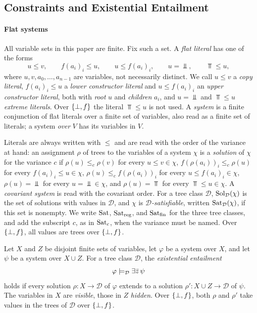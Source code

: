 \subsection{Constraints and Existential Entailment}\label{sec:bg-constraints}

\paragraph{Flat systems}
All variable sets in this paper are finite. Fix such a set. A \emph{flat literal} has one of the forms
\[
 u\le v,\qquad f(a_i)_i\le u,\qquad u\le f(a_i)_i,\qquad u=\Bot,\qquad
 \Top\le u,
\]
where $u,v,a_0,\ldots,a_{n-1}$ are variables, not necessarily distinct. We call
$u\le v$ a \emph{copy literal}, $f(a_i)_i\le u$ a \emph{lower constructor
literal} and $u\le f(a_i)_i$ an \emph{upper constructor literal}, both with
\emph{root} $u$ and \emph{children} $a_i$, and $u=\Bot$ and $\Top\le u$
\emph{extreme literals}. Over $\{\bot,f\}$ the literal $\Top\le u$ is not used. A
\emph{system} is a finite conjunction of flat literals over a finite set of
variables, also read as a finite set of literals; a system \emph{over} $V$ has
its variables in $V$.

Literals are always written with $\le$ and are read with the order of the
variance at hand: an assignment $\rho$ of trees to the variables of a system
$\chi$ is a \emph{solution} of $\chi$ for the variance $c$ if
$\rho(u)\le_c\rho(v)$ for every $u\le v\in\chi$,
$f(\rho(a_i))_i\le_c\rho(u)$ for every $f(a_i)_i\le u\in\chi$,
$\rho(u)\le_c f(\rho(a_i))_i$ for every $u\le f(a_i)_i\in\chi$, $\rho(u)=\Bot$
for every $u=\Bot\in\chi$, and $\rho(u)=\Top$ for every $\Top\le u\in\chi$. A
\emph{covariant system} is read with the covariant order. For a tree class
$\mathcal D$, $\operatorname{Sol}_{\mathcal D}(\chi)$ is the set of solutions with values in
$\mathcal D$, and $\chi$ is \emph{$\mathcal D$-satisfiable}, written
$\operatorname{Sat}_{\mathcal D}(\chi)$, if this set is nonempty. We write $\operatorname{Sat}$,
$\operatorname{Sat}_{\mathrm{reg}}$, and $\operatorname{Sat}_{\mathrm{fin}}$ for the three tree classes,
and add the subscript $c$, as in $\operatorname{Sat}_c$, when the variance must be named.
Over $\{\bot,f\}$, all values are trees over $\{\bot,f\}$.

\begin{definition}\label{def:bg-existential}
Let $X$ and $Z$ be disjoint finite sets of variables, let $\varphi$ be a system
over $X$, and let $\psi$ be a system over $X\cup Z$. For a tree class
$\mathcal D$, the \emph{existential entailment}
\[
 \varphi\models_{\mathcal D}\exists\bar z\,\psi
\]
holds if every solution $\rho:X\to\mathcal D$ of $\varphi$ extends to a solution
$\rho':X\cup Z\to\mathcal D$ of $\psi$. The variables in $X$ are
\emph{visible}, those in $Z$ \emph{hidden}. Over $\{\bot,f\}$, both $\rho$ and $\rho'$
take values in the trees of $\mathcal D$ over $\{\bot,f\}$.
\end{definition}

